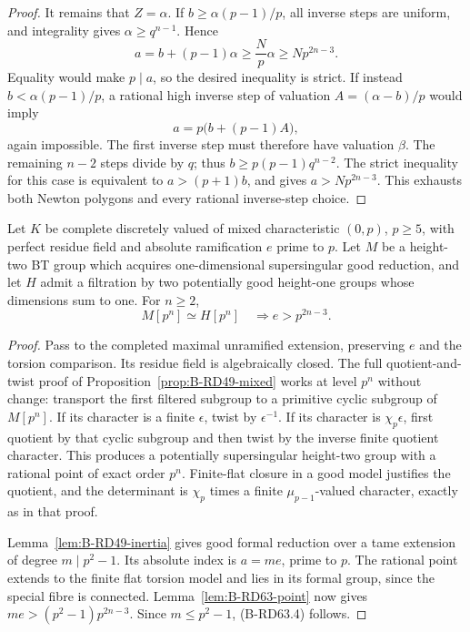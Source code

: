 \begin{proof}
It remains that $Z=\alpha$. If $b\ge\alpha(p-1)/p$, all inverse
steps are uniform, and integrality gives $\alpha\ge q^{n-1}$.
Hence
\[
 a=b+(p-1)\alpha\ge\frac{N}{p}\alpha
       \ge Np^{2n-3}.
\]
Equality would make $p\mid a$, so the desired inequality is strict.
If instead $b<\alpha(p-1)/p$, a rational high inverse step of
valuation $A=(\alpha-b)/p$ would imply
\[
                   a=p\bigl(b+(p-1)A\bigr),
\]
again impossible. The first inverse step must therefore have
valuation $\beta$. The remaining $n-2$ steps divide by $q$;
thus $b\ge p(p-1)q^{n-2}$. The strict inequality for this case
is equivalent to $a>(p+1)b$, and gives
$a>Np^{2n-3}$. This exhausts both Newton polygons and every
rational inverse-step choice.
\end{proof}

\begin{proposition}
\label{prop:B-RD63-mixed}
Let $K$ be complete discretely valued of mixed characteristic
$(0,p)$, $p\ge5$, with perfect residue field and absolute
ramification $e$ prime to $p$. Let $M$ be a height-two BT group
which acquires one-dimensional supersingular good reduction,
and let $H$ admit a filtration by two potentially good height-one
groups whose dimensions sum to one. For $n\ge2$,
\[
              M[p^n]\simeq H[p^n]\quad\Longrightarrow
                         e>p^{2n-3}.                   \tag{B-RD63.4}
\]
\end{proposition}
\begin{proof}
Pass to the completed maximal unramified extension, preserving
$e$ and the torsion comparison. Its residue field is algebraically
closed. The full quotient-and-twist proof of
Proposition~\ref{prop:B-RD49-mixed} works at level $p^n$ without
change: transport the first filtered subgroup to a primitive
cyclic subgroup of $M[p^n]$. If its character is a finite
$\epsilon$, twist by $\epsilon^{-1}$. If its character is
$\chi_p\epsilon$, first quotient by that cyclic subgroup and
then twist by the inverse finite quotient character. This produces
a potentially supersingular height-two group with a rational
point of exact order $p^n$. Finite-flat closure in a good model
justifies the quotient, and the determinant is $\chi_p$ times
a finite $\mu_{p-1}$-valued character, exactly as in that proof.

Lemma~\ref{lem:B-RD49-inertia} gives good formal reduction over
a tame extension of degree $m\mid p^2-1$. Its absolute index is
$a=me$, prime to $p$. The rational point extends to the finite
flat torsion model and lies in its formal group, since the special
fibre is connected. Lemma~\ref{lem:B-RD63-point} now gives
$me>(p^2-1)p^{2n-3}$. Since $m\le p^2-1$, (B-RD63.4) follows.
\end{proof}


